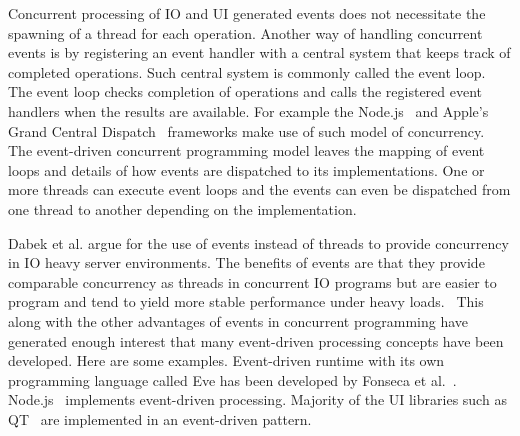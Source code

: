 Concurrent processing of IO and UI generated events does not necessitate the spawning of a thread for each operation. Another way of handling concurrent events is by registering an event handler with a central system that keeps track of completed operations. Such central system is commonly called the event loop. The event loop checks completion of operations and calls the registered event handlers when the results are available. For example the Node.js~\cite{tilkov2010node} and Apple's Grand Central Dispatch~\cite{sakamoto2012grand} frameworks make use of such model of concurrency. The event-driven concurrent programming model leaves the mapping of event loops and details of how events are dispatched to its implementations. One or more threads can execute event loops and the events can even be dispatched from one thread to another depending on the implementation.

Dabek et al. argue for the use of events instead of threads to provide concurrency in IO heavy server environments. The benefits of events are that they provide comparable concurrency as threads in concurrent IO programs but are easier to program and tend to yield more stable performance under heavy loads.~\cite{dabek2002event} This along with the other advantages of events in concurrent programming have generated enough interest that many event-driven processing concepts have been developed. Here are some examples. Event-driven runtime with its own programming language called Eve has been developed by Fonseca et al.~\cite{fonseca2014eve}. Node.js~\cite{tilkov2010node} implements event-driven processing. Majority of the UI libraries such as QT~\cite{blanchette2006cpp} are implemented in an event-driven pattern.
